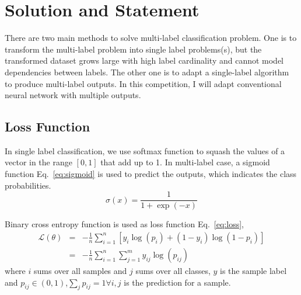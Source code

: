 \documentclass[11pt,oneside,a4paper]{article}
\begin{document}

  
\section{Solution and Statement}
\label{S:4}
There are two main methods to solve multi-label classification problem. One is to transform the multi-label problem into single label problems(s), but the transformed dataset grows large with high label cardinality and cannot model dependencies between labels. The other one is to adapt a single-label algorithm to produce multi-label outputs. In this competition, I will adapt conventional neural network with multiple outputs.

\subsection{Loss Function}
In single label classification, we use softmax function to squash the values of a vector in the range $[0,1]$ that add up to 1. In multi-label case, a sigmoid function Eq.~\ref{eq:sigmoid} is used to predict the outputs, which indicates the class probabilities. 
\begin{equation}
\sigma(x) = \frac{1}{1 + \exp{(-x)}} \label{eq:sigmoid}
\end{equation}

Binary cross entropy function is used as loss function Eq.~\ref{eq:loss},
\begin{eqnarray}
\mathcal{L}(\theta) & = &  
-\frac{1}{n}\sum^{n}_{i=1}\left[y_i \log(p_i) + (1-y_i)\log(1-p_i)\right] \nonumber \\
& = & -\frac{1}{n}\sum^{n}_{i=1}\sum^{m}_{j=1}y_{ij}\log(p_{ij}) \label{eq:loss}
\end{eqnarray}
where $i$ sums over all samples and $j$ sums over all classes, $y$ is the sample label and $p_{ij}\in(0,1)$,$\sum_{j} p_{ij} = 1 \forall i, j$ is the prediction for a sample.
\end{document}
